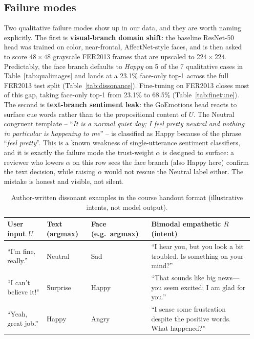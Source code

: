 \documentclass[sigconf,nonacm]{acmart}
\begin{document}
  \subsection{Failure modes}\label{sec:failmodes}
  Two qualitative failure modes show up in our data, and they are worth naming explicitly. The first is \textbf{visual-branch domain shift}: the baseline ResNet-50 head was trained on color, near-frontal, AffectNet-style faces, and is then asked to score 48$\!\times\!48$ grayscale FER2013 frames that are upscaled to 224$\!\times\!224$. Predictably, the face branch defaults to \emph{Happy} on 5 of the 7 qualitative cases in Table~\ref{tab:qualimages} and lands at a 23.1\% face-only top-1 across the full FER2013 test split (Table~\ref{tab:dissonance}). Fine-tuning on FER2013 closes most of this gap, taking face-only top-1 from 23.1\% to 68.5\% (Table~\ref{tab:finetune}). The second is \textbf{text-branch sentiment leak}: the GoEmotions head reacts to surface cue words rather than to the propositional content of $U$. The Neutral congruent template -- ``\textit{It is a normal quiet day; I feel pretty neutral and nothing in particular is happening to me}'' -- is classified as Happy because of the phrase ``\textit{feel pretty}''. This is a known weakness of single-utterance sentiment classifiers, and it is exactly the failure mode the trust-weight $\alpha$ is designed to surface: a reviewer who lowers $\alpha$ on this row sees the face branch (also Happy here) confirm the text decision, while raising $\alpha$ would not rescue the Neutral label either. The mistake is honest and visible, not silent.

  \begin{table}[t]
    \small
    \centering
    \caption{Author-written dissonant examples in the course handout format (illustrative intents, not model output).}
    \label{tab:qual}
    \setlength{\tabcolsep}{4pt}
    \begin{tabular}{@{}p{}p{}p{}p{}@{}}
      \toprule
      User input $U$ & Text (argmax) & Face (e.g.\ argmax) & Bimodal empathetic $R$ (intent) \\
      \midrule
      ``I'm fine, really.'' & Neutral & Sad & ``I hear you, but you look a bit troubled. Is something on your mind?'' \\
      ``I can't believe it!'' & Surprise & Happy & ``That sounds like big news---you seem excited; I am glad for you.'' \\
      ``Yeah, great job.'' & Happy & Angry & ``I sense some frustration despite the positive words. What happened?'' \\
      \bottomrule
    \end{tabular}
  \end{table}
\end{document}
